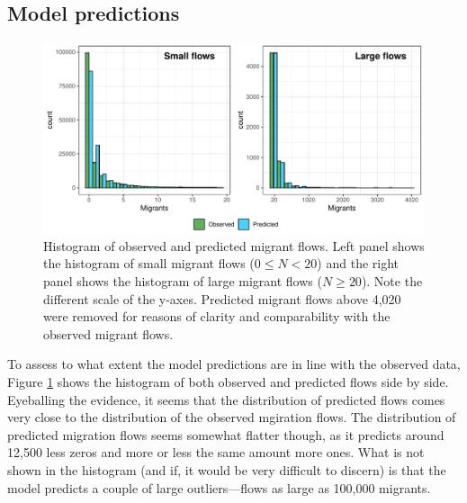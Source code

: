 \documentclass[fleqn,10pt]{SelfArx} %
\begin{document}
{{\subsection{Model predictions}

\begin{figure}[t!]\centering 
  \includegraphics[width=0.8\linewidth]{../fig/hist_fit.pdf}
  \caption{Histogram of observed and predicted migrant flows. Left
    panel shows the histogram of small migrant flows ($0 \leq N < 20$)
    and the right panel shows the histogram of large migrant flows
    ($N \geq 20$). Note the different scale of the y-axes. Predicted
    migrant flows above 4,020 were removed for reasons of clarity and
    comparability with the observed migrant flows.  }
  \label{fig:hist_fit}
\end{figure}

To assess to what extent the model predictions are in line with the
observed data, Figure \ref{fig:hist_fit} shows the histogram of both
observed and predicted flows side by side. Eyeballing the evidence, it
seems that the distribution of predicted flows comes very close to the
distribution of the observed mgiration flows. The distribution of
predicted migration flows seems somewhat flatter though, as it
predicts around 12,500 less zeros and more or less the same amount
more ones. What is not shown in the histogram (and if, it would be
very difficult to discern) is that the model predicts a couple of
large outliers---flows as large as 100,000 migrants.


}}
\end{document}
